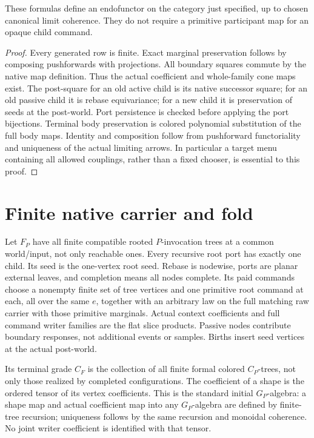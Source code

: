\documentclass[11pt]{article}
\begin{document}
\begin{proposition}
These formulas define an endofunctor on the category just specified, up to chosen canonical limit coherence. They do not require a primitive participant map for an opaque child command.
\end{proposition}
\begin{proof}
Every generated row is finite. Exact marginal preservation follows by composing pushforwards with projections. All boundary squares commute by the native map definition. Thus the actual coefficient and whole-family cone maps exist. The post-square for an old active child is its native successor square; for an old passive child it is rebase equivariance; for a new child it is preservation of seeds at the post-world. Port persistence is checked before applying the port bijections. Terminal body preservation is colored polynomial substitution of the full body maps. Identity and composition follow from pushforward functoriality and uniqueness of the actual limiting arrows. In particular a target menu containing all allowed couplings, rather than a fixed chooser, is essential to this proof.
\end{proof}

\section{Finite native carrier and fold}
Let $F_P$ have all finite compatible rooted $P$-invocation trees at a common world/input, not only reachable ones. Every recursive root port has exactly one child. Its seed is the one-vertex root seed. Rebase is nodewise, ports are planar external leaves, and completion means all nodes complete. Its paid commands choose a nonempty finite set of tree vertices and one primitive root command at each, all over the same $e$, together with an arbitrary law on the full matching raw carrier with those primitive marginals. Actual context coefficients and full command writer families are the flat slice products. Passive nodes contribute boundary responses, not additional events or samples. Births insert seed vertices at the actual post-world.

Its terminal grade $C_F$ is the collection of all finite formal colored $C_P$-trees, not only those realized by completed configurations. The coefficient of a shape is the ordered tensor of its vertex coefficients. This is the standard initial $G_P$-algebra: a shape map and actual coefficient map into any $G_P$-algebra are defined by finite-tree recursion; uniqueness follows by the same recursion and monoidal coherence. No joint writer coefficient is identified with that tensor.
\end{document}
